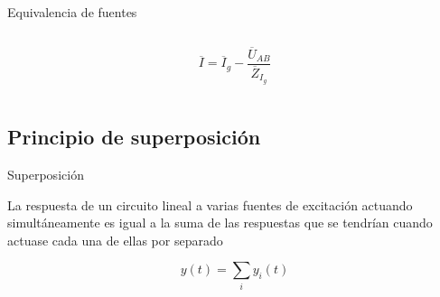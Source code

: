 \documentclass[aspectratio=169, usenames,svgnames,dvipsnames]{beamer}
\begin{document}
\begin{frame}{Equivalencia de fuentes}
\begin{columns}
\begin{column}{0.33\columnwidth}
\begin{center}
    \end{center}
    \[
      \overline{I} = \overline{I}_g - \frac{\overline{U}_{AB}}{\overline{Z}_{I_g}}
    \]
    \end{column}
    \end{columns}
\end{frame}


\subsection{Principio de superposición}

\begin{frame}{Superposición}

    \vspace{3mm}
    La respuesta de un \alert{circuito lineal} a varias fuentes de excitación actuando simultáneamente es igual a la \alert{suma de las respuestas} que se tendrían cuando actuase cada una de ellas por separado

    \vspace{-2mm}
    \[
        y(t) = \sum_i y_i(t)
    \]


\end{frame}
\end{document}
